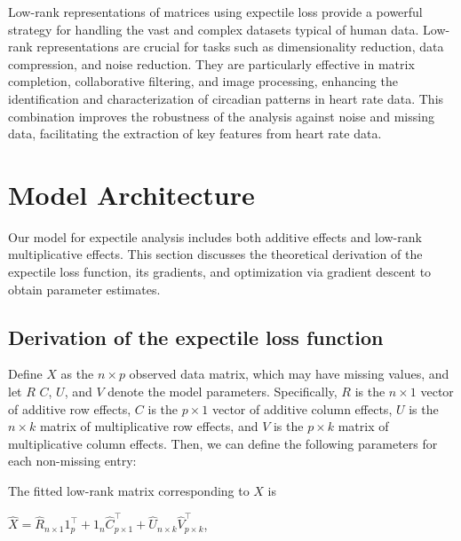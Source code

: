 \documentclass{article}
\begin{document}
Low-rank representations of matrices using expectile loss provide a powerful strategy for handling the vast and complex datasets typical of human data. Low-rank representations are crucial for tasks such as dimensionality reduction, data compression, and noise reduction. They are particularly effective in matrix completion, collaborative filtering, and image processing, enhancing the identification and characterization of circadian patterns in heart rate data. This combination improves the robustness of the analysis against noise and missing data, facilitating the extraction of key features from heart rate data.


\section{Model Architecture}

Our model for expectile analysis includes both additive effects and low-rank multiplicative effects. This section discusses the theoretical derivation of the expectile loss function, its gradients, and optimization via gradient descent to obtain parameter estimates. 

\subsection{Derivation of the expectile loss function}

Define $X$ as the $n \times p$ observed data matrix, which may have missing values, and let $R$ $C$, $U$, and $V$ denote the model parameters. Specifically, $R$ is the $n \times 1$ vector of additive row effects, $C$ is the $p \times 1$ vector of additive column effects, $U$ is the $n \times k$ matrix of multiplicative row effects, and $V$ is the $p \times k$ matrix of multiplicative column effects. Then, we can define the following parameters for each non-missing entry:

The fitted low-rank matrix corresponding to $X$ is

\begin{center}
    $\widehat{X} = \widehat{R}_{n \times 1}1^{\top}_{p} + 1_{n}\widehat{C}_{p \times 1}^{\top} + \widehat{U}_{n \times k}\widehat{V}^{\top}_{p \times k}$,
\end{center}
\end{document}
